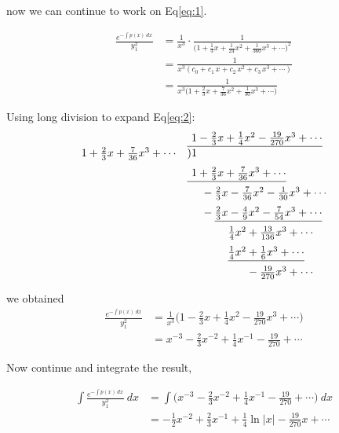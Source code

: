 \begin{solution}
    now we can continue to work on Eq\eqref{eq:1}.

    \begin{align*}
        \frac{e^{-\int p(x) \> dx}}{y_1^2} 
        &= \frac{1}{x^3} \cdot \frac{1}{\biggl(1 + \frac{1}{3}x + \frac{1}{24}x^2 + \frac{1}{360}x^3 + \cdots\biggr)^2}\\
        &= \frac{1}{x^3(c_0 + c_1\,x + c_2\,x^2 + c_3\,x^3 + \cdots)}\\
        &= \frac{1}{x^3 \biggl(1 + \frac{2}{3}x + \frac{7}{36}x^2 + \frac{1}{30}x^3 + \cdots\biggr)} \label{eq:2} \tag{b}
    \end{align*}

    Using long division to expand Eq\eqref{eq:2}:
    $$
    \begin{array}{rl}
        &\underline{\phantom{)} 1 - \frac{2}{3}x + \frac{1}{4}x^2 - \frac{19}{270}x^3 + \cdots}\\
        1+\frac{2}{3}x + \frac{7}{36}x^3 + \cdots & \smash{)}1 \\[0.6em]
        &\underline{\phantom{)} 1+\frac{2}{3}x + \frac{7}{36}x^3 + \cdots}\\[0.6em]
        &\phantom{1+}-\frac{2}{3}x - \frac{7}{36}x^2 - \frac{1}{30}x^3 + \cdots\\[0.6em]
        &\phantom{1+}-\underline{\frac{2}{3}x - \frac{4}{9}x^2 - \frac{7}{54}x^3 + \cdots}\\[0.6em]
        &\phantom{1+-\frac{2}{3}x}\frac{1}{4}x^2 + \frac{13}{136}x^3 + \cdots\\[0.6em]
        &\phantom{1+-\frac{2}{3}x}\underline{\frac{1}{4}x^2 + \frac{1}{6}x^3 + \cdots}\\[0.6em]
        &\phantom{1+-\frac{2}{3}x \frac{1}{4}x^2}-\frac{19}{270}x^3 + \cdots
    \end{array}$$

    we obtained 
    \begin{align*}
        \frac{e^{-\int p(x) \> dx}}{y_1^2}
        &= \frac{1}{x^3} \biggl(1 - \frac{2}{3}x + \frac{1}{4}x^2 - \frac{19}{270}x^3 + \cdots\biggr)\\
        &= x^{-3} - \frac{2}{3}x^{-2} + \frac{1}{4}x^{-1} - \frac{19}{270} + \cdots
    \end{align*}

    Now continue and integrate the result,

    \begin{align*}
        \int \frac{e^{-\int p(x) \> dx}}{y_1^2} \>dx &= \int \biggl(x^{-3} - \frac{2}{3}x^{-2} + \frac{1}{4}x^{-1} - \frac{19}{270} + \cdots \biggr)\> dx\\
        &= -\frac{1}{2}x^{-2} + \frac{2}{3}x^{-1} + \frac{1}{4} \ln |x| - \frac{19}{270}x + \cdots
    \end{align*}


\end{solution}
